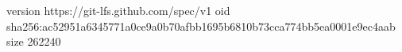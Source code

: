 version https://git-lfs.github.com/spec/v1
oid sha256:ac52951a6345771a0ce9a0b70afbb1695b6810b73cca774bb5ea0001e9ec4aab
size 262240
